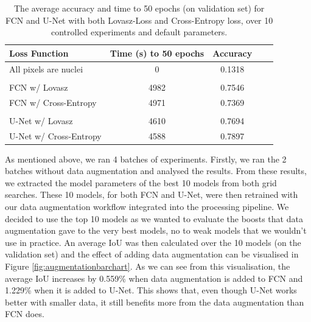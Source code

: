 \documentclass{article}
\begin{document}
\begin{table}[htbp]
\vskip 3mm
\begin{center}
\begin{small}
\begin{sc}
\begin{tabular}{lcccr}
\hline
\abovespace\belowspace
Loss Function & Time (s) to 50 epochs & Accuracy \\
\hline
\abovespace
All pixels are nuclei & 0 & 0.1318 \\
\\
FCN w/ Lovasz & 4982 & 0.7546 \\
FCN w/ Cross-Entropy & 4971 & 0.7369 \\
\\
U-Net w/ Lovasz & 4610 & 0.7694 \\
\belowspace
U-Net w/ Cross-Entropy & 4588 & 0.7897\\
\hline
\end{tabular}
\end{sc}
\end{small}
\caption{The average accuracy and time to 50 epochs (on validation set) for FCN and U-Net with both Lovasz-Loss and Cross-Entropy loss, over 10 controlled experiments and default parameters.}
\label{tab:loss_functions}
\end{center}
\vskip -3mm
\end{table}

As mentioned above, we ran 4 batches of experiments. Firstly, we ran the 2 batches without data augmentation and analysed the results. From these results, we extracted the model parameters of the best 10 models from both grid searches. These 10 models, for both FCN and U-Net, were then retrained with our data augmentation workflow integrated into the processing pipeline. We decided to use the top 10 models as we wanted to evaluate the boosts that data augmentation gave to the very best models, no to weak models that we wouldn't use in practice. An average IoU was then calculated over the 10 models (on the validation set) and the effect of adding data augmentation can be visualised in Figure \ref{fig:augmentationbarchart}. As we can see from this visualisation, the average IoU increases by 0.559\% when data augmentation is added to FCN and 1.229\% when it is added to U-Net. This shows that, even though U-Net works better with smaller data, it still benefits more from the data augmentation than FCN does. 
\end{document}
